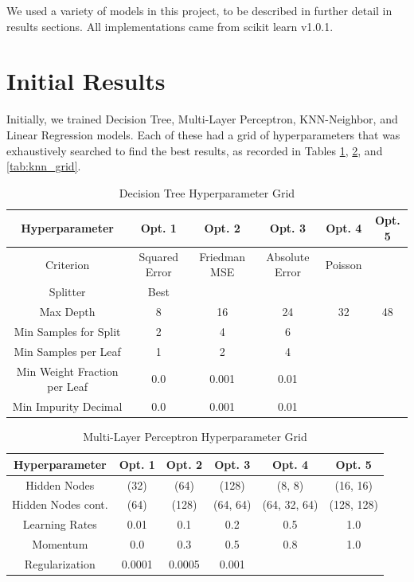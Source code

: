 \documentclass{article}
\begin{document}
We used a variety of models in this project, to be described in further detail
in results sections. All implementations came from scikit learn v1.0.1.

\section{Initial Results}

Initially, we trained Decision Tree, Multi-Layer Perceptron, KNN-Neighbor, and
Linear Regression models. Each of these had a grid of hyperparameters that was
exhaustively searched to find the best results, as recorded in Tables
\ref{tab:dt_grid}, \ref{tab:mlp_grid}, and \ref{tab:knn_grid}.

\begin{table}
	\begin{center}
		\begin{tabular}{||c c c c c c||} 
		\hline\hline
		Hyperparameter & Opt. 1 & Opt. 2 & Opt. 3 & Opt. 4 & Opt. 5 \\ 
		\hline\hline
		Criterion & Squared Error & Friedman MSE & Absolute Error & Poisson & \\ \hline 
		Splitter & Best & & & &  \\ \hline
		Max Depth & 8 & 16 & 24 & 32 & 48 \\ \hline
		Min Samples for Split & 2 & 4 & 6 & &  \\ \hline
		Min Samples per Leaf & 1 & 2 & 4 & &  \\ \hline
		Min Weight Fraction per Leaf & 0.0 & 0.001 & 0.01 & &  \\ \hline
		Min Impurity Decimal & 0.0 & 0.001 & 0.01 & &  \\
		\hline\hline
		\end{tabular}
	\end{center}
	\caption{Decision Tree Hyperparameter Grid}
	\label{tab:dt_grid}
\end{table}

\begin{table}
	\begin{center}
		\begin{tabular}{||c c c c c c||} 
		\hline\hline
		Hyperparameter & Opt. 1 & Opt. 2 & Opt. 3 & Opt. 4 & Opt. 5 \\ 
		\hline\hline
		Hidden Nodes & (32) & (64) & (128) & (8, 8) & (16, 16) \\ \hline
		Hidden Nodes cont. & (64) & (128) & (64, 64) & (64, 32, 64) & (128, 128) \\ \hline
		Learning Rates & 0.01 & 0.1 & 0.2 & 0.5 & 1.0 \\ \hline
		Momentum & 0.0 & 0.3 & 0.5 & 0.8 & 1.0 \\ \hline
		Regularization & 0.0001 & 0.0005 & 0.001 & & \\ 
		\hline\hline
		\end{tabular}
	\end{center}
	\caption{Multi-Layer Perceptron Hyperparameter Grid}
	\label{tab:mlp_grid}
\end{table}
\end{document}
